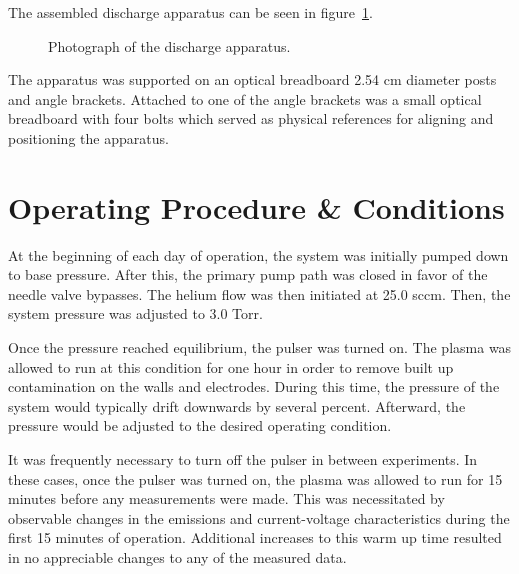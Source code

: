 The assembled discharge apparatus can be seen in figure~\ref{fig:appphoto}.
\begin{figure}
  \centering
  \setlength\fboxsep{0pt}
  \setlength\fboxrule{1.0pt}
  \caption{Photograph of the discharge apparatus.}
  \label{fig:appphoto}
\end{figure}
The apparatus was supported on an optical breadboard 2.54 cm diameter posts and
angle brackets. Attached to one of the angle brackets was a small optical
breadboard with four bolts which served as physical references for aligning and
positioning the apparatus.

\section{Operating Procedure \& Conditions}

At the beginning of each day of operation, the system was initially pumped down
to base pressure. After this, the primary pump path was closed in favor of the
needle valve bypasses. The helium flow was then initiated at 25.0 sccm. Then,
the system pressure was adjusted to 3.0 Torr.

Once the pressure reached equilibrium, the pulser was turned on. The plasma was
allowed to run at this condition for one hour in order to remove built up
contamination on the walls and electrodes. During this time, the pressure of the
system would typically drift downwards by several percent. Afterward, the
pressure would be adjusted to the desired operating condition.

It was frequently necessary to turn off the pulser in between experiments. In
these cases, once the pulser was turned on, the plasma was allowed to run for 15
minutes before any measurements were made. This was necessitated by observable
changes in the emissions and current-voltage characteristics during the first 15
minutes of operation. Additional increases to this warm up time resulted in no
appreciable changes to any of the measured data.



